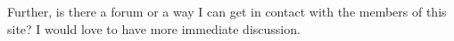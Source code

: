 \begin{footnotesize}
\begin{sffamily}
Further, is there a forum or a way I can get in contact with the members of this site? I would love to have more immediate discussion.


\hfill

\end{sffamily}
\end{footnotesize}

